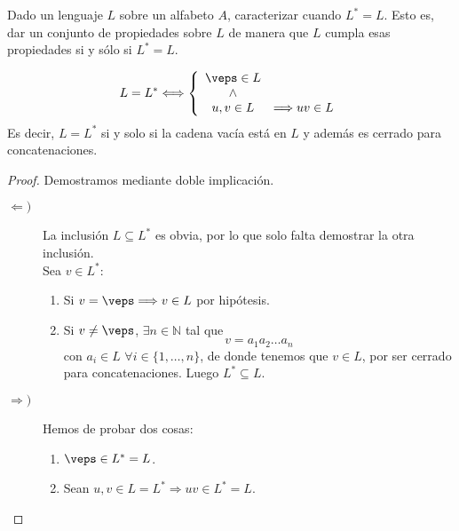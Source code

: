 \begin{ejercicio}
    Dado un lenguaje $L$ sobre un alfabeto $A$, caracterizar cuando $L^{\ast} = L$. Esto es, dar un conjunto de propiedades sobre $L$ de manera que $L$ cumpla esas propiedades si y sólo si $L^{\ast} = L$.

    \begin{equation*}
        L = L^{\ast} \Longleftrightarrow \left\{
            \begin{array}{cl}
                \veps \in L \\ \land \\ u,v \in L & \Longrightarrow uv\in L
            \end{array}
        \right.
    \end{equation*}
    Es decir, $L=L^{\ast}$ si y solo si la cadena vacía está en $L$ y además es cerrado para concatenaciones.

    \begin{proof} Demostramos mediante doble implicación.
        \begin{description}
            \item [$\Longleftarrow)$] La inclusión $L\subseteq L^{\ast}$ es obvia, por lo que solo falta demostrar la otra inclusión.\\

                Sea $v\in L^{\ast}$:
                \begin{enumerate}
                    \item Si $v = \veps \Longrightarrow v\in L$ por hipótesis.
                    \item Si $v\neq \veps$, $\exists n\in \mathbb{N}$ tal que 
                        \begin{equation*}
                            v = a_1 a_2 \ldots a_n
                        \end{equation*}
                        con $a_i \in L$ $\forall i \in \{1, \ldots, n\}$, de donde tenemos que $v\in L$, por ser cerrado para concatenaciones. Luego $L^{\ast}\subseteq L$.
                \end{enumerate}
            \item [$\Longrightarrow)$] Hemos de probar dos cosas:
                \begin{enumerate}
                    \item $\veps \in L^{\ast}=L$.
                    \item Sean $u,v\in L=L^{\ast} \Longrightarrow uv\in L^{\ast}=L$.
                \end{enumerate}
        \end{description}
    \end{proof}
\end{ejercicio}

